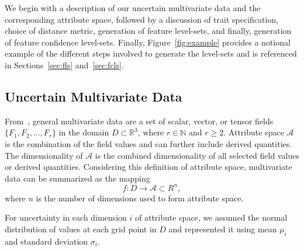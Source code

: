 \setlength{\belowdisplayskip}{5pt} \setlength{\belowdisplayshortskip}{5pt}
\setlength{\abovedisplayskip}{5pt} \setlength{\abovedisplayshortskip}{5pt}

We begin with a description of our uncertain multivariate data and the corresponding attribute space, followed by a discussion of trait specification, choice of distance metric, generation of feature level-sets, and finally, generation of feature confidence level-sets.
%
Finally, Figure~\ref{fig:example} provides a notional example of the different steps involved to generate the level-sets and is referenced in Sections~\ref{sec:fls} and~\ref{sec:fcls}.
%

\vspace{-1mm}
\subsection{Uncertain Multivariate Data}
%
From~\cite{jankowai2020feature}, general multivariate data are a set of scalar, vector, or tensor fields $\{F_1,F_2,...,F_r\}$ in the domain $D \subset \mathbb{R}^{3}$, where $r\in\mathbb{N}$ and $r\geq2$.
%
%
%
Attribute space $\mathcal{A}$ is the combination of the field values and can further include derived quantities.
%
The dimensionality of $\mathcal{A}$ is the combined dimensionality of all selected field values or derived quantities.
%
Considering this definition of attribute space, multivariate data can be summarized as the mapping
\begin{equation}
f : D \to \mathcal{A} \subset R^{n},
\end{equation}
%
where $n$ is the number of dimensions used to form attribute space. 
%
%

For uncertainty in each dimension $i$ of attribute space, we assumed the normal distribution of values at each grid point in $D$ and represented it using mean ${\mu}_{i}$ and standard deviation ${\sigma}_{i}$. 

\vspace{-2mm}
